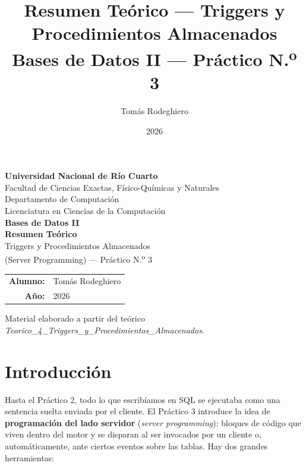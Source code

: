 \documentclass[11pt,a4paper]{article}
\title{Resumen Teórico --- Triggers y Procedimientos Almacenados\\[4pt]
       \large Bases de Datos II --- Práctico N.\textsuperscript{o} 3}
\author{Tomás Rodeghiero}
\date{2026}
\begin{document}
\begin{titlepage}
    \centering
    \vspace*{1.5cm}

    {\large \textbf{Universidad Nacional de Río Cuarto}}\\[6pt]
    {\normalsize Facultad de Ciencias Exactas, Físico-Químicas y Naturales}\\[4pt]
    {\normalsize Departamento de Computación}\\[4pt]
    {\normalsize Licenciatura en Ciencias de la Computación}\\[3cm]

    {\Large \textbf{Bases de Datos II}}\\[1.2cm]

    {\Large \textbf{Resumen Teórico}}\\[6pt]
    {\large Triggers y Procedimientos Almacenados\\[2pt]
    (Server Programming) --- Práctico N.\textsuperscript{o} 3}\\[3cm]

    \begin{tabular}{rl}
        \textbf{Alumno:} & Tomás Rodeghiero \\[4pt]
        \textbf{Año:}    & 2026 \\
    \end{tabular}

    \vfill
    {\small Material elaborado a partir del teórico
    \emph{Teorico\_4\_Triggers\_y\_Procedimientos\_Almacenados}.}
\end{titlepage}

\tableofcontents
\newpage

\section{Introducción}

Hasta el Práctico 2, todo lo que escribíamos en SQL se ejecutaba como
una sentencia suelta enviada por el cliente. El Práctico 3 introduce
la idea de \textbf{programación del lado servidor} (\emph{server
programming}): bloques de código que viven dentro del motor y se
disparan al ser invocados por un cliente o, automáticamente, ante
ciertos eventos sobre las tablas. Hay dos grandes herramientas:
\end{document}
